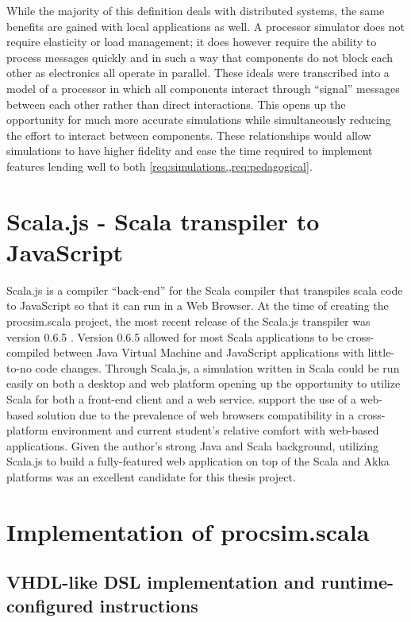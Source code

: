 While the majority of this definition deals with distributed systems, the same benefits are gained with local applications as well. A processor simulator does not require elasticity or load management; it does however require the ability to process messages quickly and in such a way that components do not block each other as electronics all operate in parallel. These ideals were transcribed into a model of a processor in which all components interact through ``signal'' messages between each other rather than direct interactions. This opens up the opportunity for much more accurate simulations while simultaneously reducing the effort to interact between components. These relationships would allow simulations to have higher fidelity and ease the time required to implement features lending well to both \cref{req:simulations,,req:pedagogical}. 

\section{Scala.js - Scala transpiler to JavaScript}

Scala.js is a compiler ``back-end'' for the Scala compiler that transpiles scala code to JavaScript so that it can run in a Web Browser. At the time of creating the procsim.scala project, the most recent release of the Scala.js transpiler was version 0.6.5 \cite{Scala-js2015}. Version 0.6.5 allowed for most Scala applications to be cross-compiled between Java Virtual Machine and JavaScript applications with little-to-no code changes. Through Scala.js, a simulation written in Scala could be run easily on both a desktop and web platform opening up the opportunity to utilize Scala for both a front-end client and a web service.  support the use of a web-based solution due to the prevalence of web browsers compatibility in a cross-platform environment and current student's relative comfort with web-based applications. Given the author's strong Java and Scala background, utilizing Scala.js to build a fully-featured web application on top of the Scala and Akka platforms was an excellent candidate for this thesis project.

\section{Implementation of procsim.scala}

\subsection{VHDL-like DSL implementation and runtime-configured instructions}

